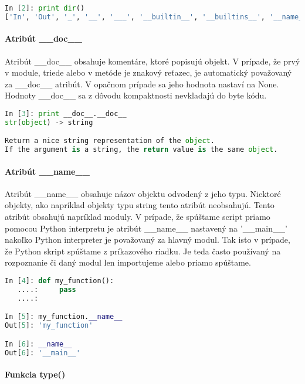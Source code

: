 \documentclass[11pt,oneside,final]{fithesis2}
\begin{document}
\begin{lstlisting}[language=python]
In [2]: print dir()
['In', 'Out', '_', '__', '___', '__builtin__', '__builtins__', '__name__', '_dh', '_i', '_i1', '_i2', '_ih', '_ii', '_iii', '_oh', '_sh', 'exit', 'get_ipython', 'help', 'quit']

\end{lstlisting}
	

		\paragraph{Atribút \_\_doc\_\_ }
			Atribút \_\_doc\_\_ obsahuje komentáre, ktoré popisujú objekt. V prípade, že prvý v module, triede alebo v metóde je znakový reťazec, je automatický považovaný za \_\_doc\_\_ atribút. V opačnom prípade sa jeho hodnota nastaví na None. Hodnoty \_\_doc\_\_ sa z dôvodu kompaktnosti nevkladajú do byte kódu.
			
\begin{lstlisting}[language=python]
In [3]: print __doc__.__doc__
str(object) -> string

Return a nice string representation of the object.
If the argument is a string, the return value is the same object.
\end{lstlisting}

		\paragraph{Atribút \_\_name\_\_ }
			Atribút \_\_name\_\_ obsahuje názov objektu odvodený z jeho typu. Niektoré objekty, ako napríklad objekty typu string tento atribút neobsahujú. Tento atribút obsahujú napríklad moduly. V prípade, že spúštame script priamo pomocou Python interpretu je atribút \_\_name\_\_ nastavený na '\_\_main\_\_' nakoľko Python interpreter je považovaný za hlavný modul. Tak isto v prípade, že Python skript spúštame z príkazového riadku. Je teda často používaný na rozpoznanie či daný modul len importujeme alebo priamo spúštame.
	
\begin{lstlisting}[language=python]		
In [4]: def my_function():
   ....:     pass
   ....: 

In [5]: my_function.__name__
Out[5]: 'my_function'

In [6]: __name__
Out[6]: '__main__'
\end{lstlisting}

		\paragraph{Funkcia type()}
		
\end{document}
